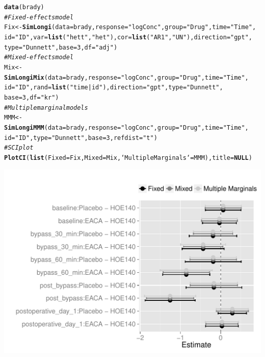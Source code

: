 \documentclass[a4paper]{article}\usepackage[]{graphicx}\usepackage[]{color}
\makeatletter
\def\maxwidth{ %
  \ifdim\Gin@nat@width>\linewidth
    \linewidth
  \else
    \Gin@nat@width
  \fi
}
\newcommand{\hlnum}[1]{\textcolor[rgb]{0.686,0.059,0.569}{#1}}%
\newcommand{\hlstr}[1]{\textcolor[rgb]{0.192,0.494,0.8}{#1}}%
\newcommand{\hlcom}[1]{\textcolor[rgb]{0.678,0.584,0.686}{\textit{#1}}}%
\newcommand{\hlstd}[1]{\textcolor[rgb]{0.345,0.345,0.345}{#1}}%
\newcommand{\hlkwa}[1]{\textcolor[rgb]{0.161,0.373,0.58}{\textbf{#1}}}%
\newcommand{\hlkwb}[1]{\textcolor[rgb]{0.69,0.353,0.396}{#1}}%
\newcommand{\hlkwc}[1]{\textcolor[rgb]{0.333,0.667,0.333}{#1}}%
\newcommand{\hlkwd}[1]{\textcolor[rgb]{0.737,0.353,0.396}{\textbf{#1}}}%
\newenvironment{kframe}{%
 \def\at@end@of@kframe{}%
 \ifinner\ifhmode%
  \def\at@end@of@kframe{\end{minipage}}%
  \begin{minipage}{\columnwidth}%
 \fi\fi%
 \def\FrameCommand##1{\hskip\@totalleftmargin \hskip-\fboxsep
 \colorbox{shadecolor}{##1}\hskip-\fboxsep
     \hskip-\linewidth \hskip-\@totalleftmargin \hskip\columnwidth}%
 \MakeFramed {\advance\hsize-\width
   \@totalleftmargin\z@ \linewidth\hsize
   \@setminipage}}%
 {\par\unskip\endMakeFramed%
 \at@end@of@kframe}
\newenvironment{knitrout}{}{} %
\makeatother
\begin{document}
\begin{knitrout}
\color{fgcolor}\begin{kframe}
\begin{alltt}
\hlkwd{data}\hlstd{(brady)}
\hlcom{# Fixed-effects model}
\hlstd{Fix} \hlkwb{<-} \hlkwd{SimLongi}\hlstd{(}\hlkwc{data} \hlstd{= brady,} \hlkwc{response} \hlstd{=} \hlstr{"logConc"}\hlstd{,} \hlkwc{group} \hlstd{=} \hlstr{"Drug"}\hlstd{,} \hlkwc{time} \hlstd{=} \hlstr{"Time"}\hlstd{,}
    \hlkwc{id} \hlstd{=} \hlstr{"ID"}\hlstd{,} \hlkwc{var} \hlstd{=} \hlkwd{list}\hlstd{(}\hlstr{"hett"}\hlstd{,} \hlstr{"het"}\hlstd{),} \hlkwc{cor} \hlstd{=} \hlkwd{list}\hlstd{(}\hlstr{"AR1"}\hlstd{,} \hlstr{"UN"}\hlstd{),} \hlkwc{direction} \hlstd{=} \hlstr{"gpt"}\hlstd{,}
    \hlkwc{type} \hlstd{=} \hlstr{"Dunnett"}\hlstd{,} \hlkwc{base} \hlstd{=} \hlnum{3}\hlstd{,} \hlkwc{df} \hlstd{=} \hlstr{"adj"}\hlstd{)}
\hlcom{# Mixed-effects model}
\hlstd{Mix} \hlkwb{<-} \hlkwd{SimLongiMix}\hlstd{(}\hlkwc{data} \hlstd{= brady,} \hlkwc{response} \hlstd{=} \hlstr{"logConc"}\hlstd{,} \hlkwc{group} \hlstd{=} \hlstr{"Drug"}\hlstd{,} \hlkwc{time} \hlstd{=} \hlstr{"Time"}\hlstd{,}
    \hlkwc{id} \hlstd{=} \hlstr{"ID"}\hlstd{,} \hlkwc{rand} \hlstd{=} \hlkwd{list}\hlstd{(}\hlstr{"time|id"}\hlstd{),} \hlkwc{direction} \hlstd{=} \hlstr{"gpt"}\hlstd{,} \hlkwc{type} \hlstd{=} \hlstr{"Dunnett"}\hlstd{,}
    \hlkwc{base} \hlstd{=} \hlnum{3}\hlstd{,} \hlkwc{df} \hlstd{=} \hlstr{"kr"}\hlstd{)}
\hlcom{# Multiple marginal models}
\hlstd{MMM} \hlkwb{<-} \hlkwd{SimLongiMMM}\hlstd{(}\hlkwc{data} \hlstd{= brady,} \hlkwc{response} \hlstd{=} \hlstr{"logConc"}\hlstd{,} \hlkwc{group} \hlstd{=} \hlstr{"Drug"}\hlstd{,} \hlkwc{time} \hlstd{=} \hlstr{"Time"}\hlstd{,}
    \hlkwc{id} \hlstd{=} \hlstr{"ID"}\hlstd{,} \hlkwc{type} \hlstd{=} \hlstr{"Dunnett"}\hlstd{,} \hlkwc{base} \hlstd{=} \hlnum{3}\hlstd{,} \hlkwc{refdist} \hlstd{=} \hlstr{"t"}\hlstd{)}
\hlcom{# SCI plot}
\hlkwd{PlotCI}\hlstd{(}\hlkwd{list}\hlstd{(}\hlkwc{Fixed} \hlstd{= Fix,} \hlkwc{Mixed} \hlstd{= Mix,} \hlkwc{`Multiple Marginals`} \hlstd{= MMM),} \hlkwc{title} \hlstd{=} \hlkwa{NULL}\hlstd{)}
\end{alltt}
\end{kframe}
\includegraphics[width=\maxwidth]{figure/PLOTSCI} 

\end{knitrout}
\end{document}
